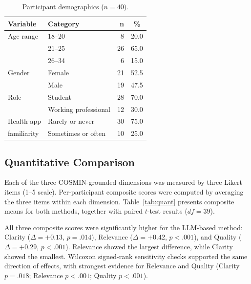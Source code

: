\documentclass[conference]{IEEEtran}
\begin{document}
\begin{table}[t]
\caption{Participant demographics ($n = 40$).}
\label{tab:demographics}
\centering
\small
\begin{tabular}{@{}llrc@{}}
\toprule
\textbf{Variable} & \textbf{Category} & \textbf{n} & \textbf{\%} \\
\midrule
Age range   & 18--20  &  8 & 20.0 \\
            & 21--25  & 26 & 65.0 \\
            & 26--34  &  6 & 15.0 \\
\addlinespace
Gender      & Female  & 21 & 52.5 \\
            & Male    & 19 & 47.5 \\
\addlinespace
Role        & Student & 28 & 70.0 \\
            & Working professional & 12 & 30.0 \\
\addlinespace
Health-app  & Rarely or never & 30 & 75.0 \\
familiarity & Sometimes or often & 10 & 25.0 \\
\bottomrule
\end{tabular}
\end{table}

\subsection{Quantitative Comparison}
\label{subsec:quant}

Each of the three COSMIN-grounded dimensions was measured by three
Likert items (1--5 scale). Per-participant composite scores were
computed by averaging the three items within each dimension.
Table~\ref{tab:quant} presents composite means for both
methods, together with paired $t$-test results ($df = 39$).

All three composite scores were significantly higher for the LLM-based
method: Clarity ($\Delta = +0.13$, $p = .014$), Relevance
($\Delta = +0.42$, $p < .001$), and Quality ($\Delta = +0.29$,
$p < .001$). Relevance showed the largest difference, while Clarity
showed the smallest. Wilcoxon signed-rank sensitivity checks supported
the same direction of effects, with strongest evidence for Relevance and Quality (Clarity $p=.018$; Relevance $p<.001$; Quality $p<.001$).
\end{document}
